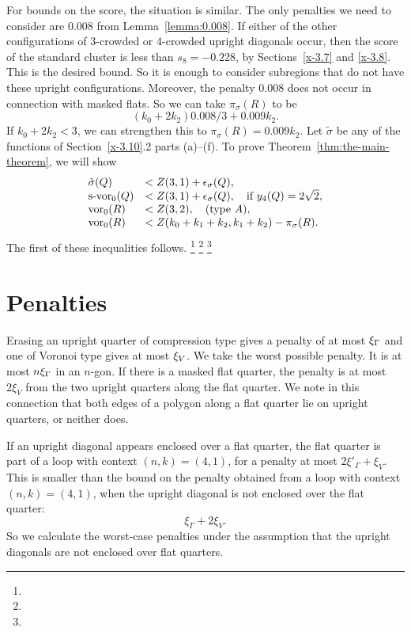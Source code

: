 For bounds on the score, the situation is similar.  The only
penalties we need to consider are $0.008$ from
Lemma~\ref{lemma:0.008}. If either of the other configurations of
$3$-crowded or $4$-crowded upright diagonals occur, then the score
of the standard cluster is less than $s_8=-0.228$, by
Sections~\ref{x-3.7} and \ref{x-3.8}. This is the desired bound.
So it is enough to consider subregions that do not have these
upright configurations. Moreover, the penalty $0.008$ does not
occur in connection with masked flats. So we can take
$\pi_\sigma(R)$ to be
    $$(k_0+2k_2)0.008/3 + 0.009 k_2.$$
If $k_0+2k_2<3$, we can strengthen this to
    $\pi_\sigma(R)=0.009 k_2$.
Let $\tilde\sigma$ be any of the functions of Section~\ref{x-3.10}.2
parts (a)--(f). To prove Theorem~\ref{thm:the-main-theorem}, we will
show
    \begin{equation}
    \begin{array}{lll}
    \tilde\sigma(Q)&< Z(3,1)+\epsilon_\sigma(Q),\\
    \operatorname{s-vor}_0(Q)&< Z(3,1)+\epsilon_\sigma(Q),\quad\text{if }y_4(Q)=2\sqrt2,\\
    \operatorname{vor}_0(R)&< Z(3,2),\quad\text{(type $A$)},\\
    \operatorname{vor}_0(R) &< Z(k_0+k_1+k_2,k_1+k_2) - \pi_\sigma(R).
    \label{eqn:sigma<Z(n,k)}
    \end{array}
    \end{equation}
The first of these inequalities follows.%
\footnote{} %
\footnote{} %
\footnote{} %


\section{Penalties} %
\label{sec:4.2} \label{sec:penalty}

Erasing an upright quarter of compression type gives a penalty of
at most $\xi_\Gamma$ and one of Voronoi type gives at most $\xi_V$. We
take the worst possible penalty.  It is at most $n\xi_\Gamma$ in an
$n$-gon. If there is a masked flat quarter, the penalty is at most
$2\xi_V$ from the two upright quarters along the flat quarter.  We
note in this connection that both edges of a polygon along a flat
quarter lie on upright quarters, or neither does.

If an upright diagonal appears enclosed over a flat quarter, the
flat quarter is part of a loop with context $(n,k)=(4,1)$, for a
penalty at most $2\xi'_\Gamma+\xi_V$.  This is smaller than the
bound on the penalty obtained from a loop with context
$(n,k)=(4,1)$, when the upright diagonal is not enclosed over the
flat quarter:
    $$\xi_\Gamma + 2\xi_V.$$
So we calculate the worst-case penalties under the assumption that
the upright diagonals are not enclosed over flat quarters.


